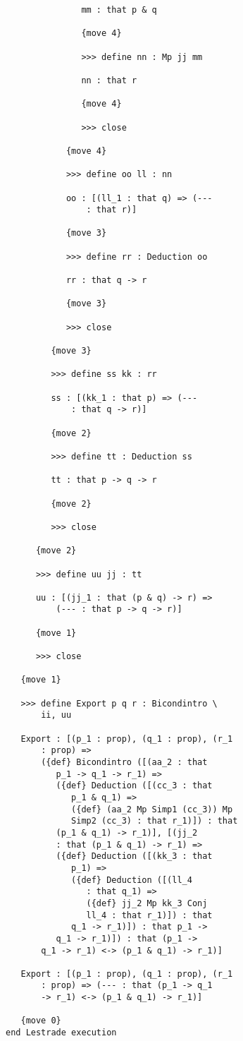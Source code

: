 \documentclass[12pt]{article}
\begin{document}
\begin{verbatim}
               mm : that p & q

               {move 4}

               >>> define nn : Mp jj mm

               nn : that r

               {move 4}

               >>> close

            {move 4}

            >>> define oo ll : nn

            oo : [(ll_1 : that q) => (--- 
                : that r)]

            {move 3}

            >>> define rr : Deduction oo

            rr : that q -> r

            {move 3}

            >>> close

         {move 3}

         >>> define ss kk : rr

         ss : [(kk_1 : that p) => (--- 
             : that q -> r)]

         {move 2}

         >>> define tt : Deduction ss

         tt : that p -> q -> r

         {move 2}

         >>> close

      {move 2}

      >>> define uu jj : tt

      uu : [(jj_1 : that (p & q) -> r) => 
          (--- : that p -> q -> r)]

      {move 1}

      >>> close

   {move 1}

   >>> define Export p q r : Bicondintro \
       ii, uu

   Export : [(p_1 : prop), (q_1 : prop), (r_1 
       : prop) => 
       ({def} Bicondintro ([(aa_2 : that 
          p_1 -> q_1 -> r_1) => 
          ({def} Deduction ([(cc_3 : that 
             p_1 & q_1) => 
             ({def} (aa_2 Mp Simp1 (cc_3)) Mp 
             Simp2 (cc_3) : that r_1)]) : that 
          (p_1 & q_1) -> r_1)], [(jj_2 
          : that (p_1 & q_1) -> r_1) => 
          ({def} Deduction ([(kk_3 : that 
             p_1) => 
             ({def} Deduction ([(ll_4 
                : that q_1) => 
                ({def} jj_2 Mp kk_3 Conj 
                ll_4 : that r_1)]) : that 
             q_1 -> r_1)]) : that p_1 -> 
          q_1 -> r_1)]) : that (p_1 -> 
       q_1 -> r_1) <-> (p_1 & q_1) -> r_1)]

   Export : [(p_1 : prop), (q_1 : prop), (r_1 
       : prop) => (--- : that (p_1 -> q_1 
       -> r_1) <-> (p_1 & q_1) -> r_1)]

   {move 0}
end Lestrade execution

\end{verbatim}
\end{document}
